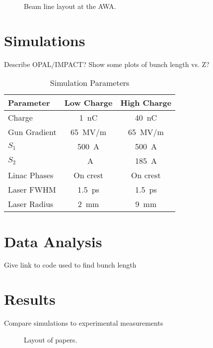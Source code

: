 \documentclass[letterpaper,  %
              ]{jacow-2_3}   %
\begin{document}
\begin{figure*}[!tbh]
	\centering
	\begin{tikzpicture}[scale=1.0, text=black]
	
	\end{tikzpicture}
	\caption{Beam line layout at the AWA.}
	\label{fig:beamline}
\end{figure*}



\section{Simulations}
Describe OPAL/IMPACT? Show some plots of bunch length vs. Z?
\begin{table}[hbt]
	\centering
	\caption{Simulation Parameters}
	\begin{tabular}{lcc}
		\toprule
		\textbf{Parameter} & \textbf{Low Charge}  & \textbf{High Charge} \\
		\midrule
		Charge       & \SI{1}{nC}        & \SI{40}{nC}    \\ %
		Gun Gradient & \SI{65}{MV/m}     & \SI{65}{MV/m}  \\ %
		$S_1$        & \SI{500}{A}		 & \SI{500}{A}	  \\
		$S_2$		 & \SI{}{A}   	 & \SI{185}{A}		 \\
		Linac Phases & On crest          & On crest       \\
		Laser FWHM   & \SI{1.5}{ps}      & \SI{1.5}{ps}   \\ %
		Laser Radius & \SI{2}{mm}        & \SI{9}{mm}     \\
		\bottomrule
	\end{tabular}
	\label{simparam}
\end{table}


\section{Data Analysis}
Give link to code used to find bunch length

\section{Results}
Compare simulations to experimental measurements
\begin{figure}[!htb]
	\centering
	\caption{Layout of papers.}
	\label{l2ea4-f1}
\end{figure}
\end{document}

